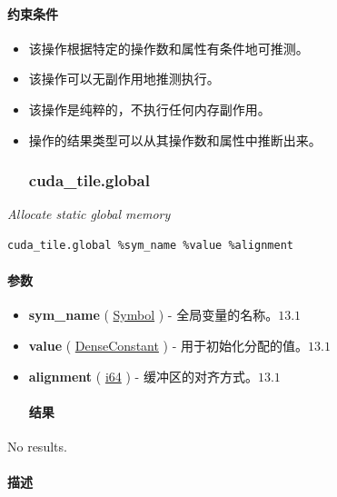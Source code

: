 \documentclass{article}
\begin{document}
\paragraph{约束条件}

\begin{itemize}
\item 该操作根据特定的操作数和属性有条件地可推测。
\item 该操作可以无副作用地推测执行。
\item 该操作是纯粹的，不执行任何内存副作用。
\item 操作的结果类型可以从其操作数和属性中推断出来。


\subsubsection{cuda\_tile.global}

\end{itemize}
\textit{Allocate static global memory}


\begin{lstlisting}
cuda_tile.global %sym_name %value %alignment
\end{lstlisting}

\paragraph{参数}

\begin{itemize}
\item \textbf{sym\_name} ( \href{https://docs.nvidia.com/cuda/tile-ir/latest/sections/operations.html#type-symbol}{Symbol} ) - 全局变量的名称。$\boxed{13.1}$
\item \textbf{value} ( \href{https://docs.nvidia.com/cuda/tile-ir/latest/sections/operations.html#type-denseconstant}{DenseConstant} ) - 用于初始化分配的值。$\boxed{13.1}$
\item \textbf{alignment} ( \href{https://docs.nvidia.com/cuda/tile-ir/latest/sections/types.html#subsection-element-types}{i64} ) - 缓冲区的对齐方式。$\boxed{13.1}$


\paragraph{结果}

\end{itemize}
No results.



\paragraph{描述}
\end{document}
